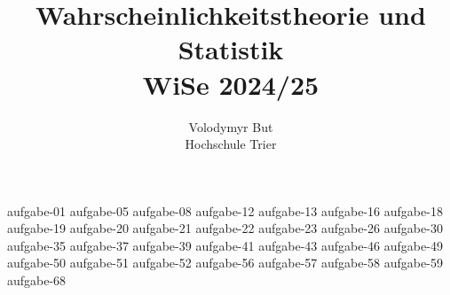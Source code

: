 \documentclass[10pt, oneside]{article}
\title{Wahrscheinlichkeitstheorie und Statistik\\[10pt]\Large{WiSe 2024/25}}
\author{Volodymyr But\\[10pt]Hochschule Trier}
\date{}
\begin{document}
\maketitle
\vspace{25px}

{aufgabe-01}
\pagebreak
{aufgabe-05}
\pagebreak
{aufgabe-08}
\pagebreak
{aufgabe-12}
\pagebreak
{aufgabe-13}
{aufgabe-16}
{aufgabe-18}
\pagebreak
{aufgabe-19}
{aufgabe-20}
\vspace{5px}
{aufgabe-21}
{aufgabe-22}
{aufgabe-23}
{aufgabe-26}
{aufgabe-30}
{aufgabe-35}
{aufgabe-37}
{aufgabe-39}
\vspace{5px}
{aufgabe-41}
{aufgabe-43}
\pagebreak
{aufgabe-46}
\pagebreak
{aufgabe-49}
{aufgabe-50}
{aufgabe-51}
\pagebreak
{aufgabe-52}
{aufgabe-56}
{aufgabe-57}
{aufgabe-58}
{aufgabe-59}
{aufgabe-68}
\end{document}
